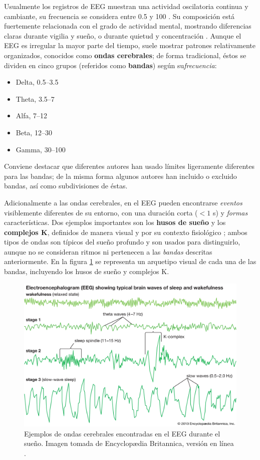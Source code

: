 Usualmente los registros de EEG muestran una actividad oscilatoria continua y cambiante, su frecuencia se considera entre 0.5 y 100 \hz. 
%
Su composición está fuertemente relacionada con el grado de actividad mental, mostrando diferencias claras durante vigilia y sueño, o durante quietud y concentración \cite{Clark98_2}.
%
Aunque el EEG es irregular la mayor parte del tiempo, suele mostrar patrones relativamente 
organizados, conocidos como \textbf{ondas cerebrales}; de forma tradicional, éstos se dividen en cinco grupos (referidos como \textbf{bandas}) según su\textit{frecuencia}:
\begin{itemize}
\item Delta, 0.5--3.5 \hz
\item Theta, 3.5--7 \hz
\item Alfa, 7--12 \hz
\item Beta, 12--30 \hz
\item Gamma, 30--100 \hz
\end{itemize}

Conviene destacar que diferentes autores han usado límites ligeramente diferentes para las bandas; de la misma forma algunos autores han incluido o excluido bandas, así como subdivisiones de éstas.

Adicionalmente a las ondas cerebrales, en el EEG pueden encontrarse \textit{eventos} visiblemente diferentes de su entorno, con%
%
una duración corta ($<1$ s) y \textit{formas} características.
%
Dos ejemplos importantes son los \textbf{husos de sueño} y los \textbf{complejos K}, definidos de manera visual y por su contexto fisiológico \cite{AASM07}; ambos tipos de ondas son típicos del sueño profundo y son usados para distinguirlo, aunque no se consideran ritmos ni pertenecen a las \textit{bandas} descritas anteriormente.
%
En la figura \ref{ritmos} se representa un arquetipo visual de cada una de las bandas, incluyendo los husos de sueño y complejos K.

\begin{figure}
\centering
\includegraphics[width=0.95\linewidth]{./img_diagramas/ondas_britannica.jpg} 
\caption[Ejemplos de ondas cerebrales encontradas en el EEG]
{Ejemplos de ondas cerebrales encontradas en el EEG durante el sueño. Imagen tomada de Encyclop{\ae}dia Britannica, 
versión en línea \cite{Britannica}.}
\label{ritmos}
\end{figure}

